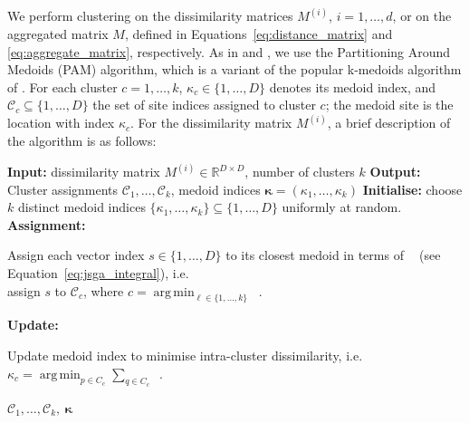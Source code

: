 \documentclass[12pt,compact]{article}
\DeclareMathOperator*{\argmin}{arg\,min}
\newcommand{\eJSGa}[1]{\mathop{\mathrm{eJS}_{i, #1}^{\mathrm{G}_{\lambda}}}\nolimits}
\DeclareRobustCommand{\eJSGai}{\mathop{\mathrm{eJS}^{\mathrm{G}_{\lambda}}}\nolimits}
\begin{document}
We perform clustering on the dissimilarity matrices $M^{(i)}$, $i = 1, \ldots, d$, or on the aggregated matrix $M$, defined in Equations~\eqref{eq:distance_matrix} and \eqref{eq:aggregate_matrix}, respectively.
As in \citet{Bernard2013} and \citet{Vignotto2021}, we use the Partitioning Around Medoids (PAM) algorithm, which is a variant of the popular k-medoids algorithm of \citet{Kaufman1987}.
For each cluster $c = 1, \ldots, k$, $\kappa_c \in \{1, \ldots, D\}$ denotes its medoid index, and $\mathcal{C}_c \subseteq \{1, \ldots, D\}$ the set of site indices assigned to cluster $c$; the medoid site is the location with index $\kappa_c$.
For the dissimilarity matrix $M^{(i)}$, a brief description of the algorithm is as follows:
\begin{algorithm}[htb]
  \caption{Partitioning Around Medoids (PAM) algorithm using the $\eJSGai{}$ divergence.}
  \label{alg:kmedoids_kappa}
  \begin{algorithmic}[1]
    \State \textbf{Input:} dissimilarity matrix $M^{(i)}\in\mathbb{R}^{D\times D}$, number of clusters $k$
    \State \textbf{Output:} Cluster assignments $\mathcal{C}_1,\dots,\mathcal{C}_k$, medoid indices $\boldsymbol{\kappa}=(\kappa_1,\dots,\kappa_k)$
    \State \textbf{Initialise:} choose $k$ distinct medoid indices $\{\kappa_1,\dots,\kappa_k\}\subseteq\{1,\dots,D\}$ uniformly at random.
    \Repeat
    \State \textbf{Assignment:} \parbox[t]{.82\linewidth}{\raggedright Assign each vector index $s\in\{1,\dots,D\}$ to its closest medoid in terms of $\eJSGai{}$ (see Equation~\eqref{eq:jsga_integral}), i.e.\ \\ assign $s$ to $\mathcal{C}_c$, where $c = \argmin_{\ell\in\{1,\dots,k\}} \eJSGa{s,\kappa_\ell}$.}
        \State \textbf{Update:} \parbox[t]{.82\linewidth}{\raggedright Update medoid index to minimise intra-cluster dissimilarity, i.e.\ $\kappa_c = \argmin_{p\in C_c}\sum_{q\in C_c} \eJSGa{p,q}$.}
        \State {}
      \EndFor
    \State \Return $\mathcal{C}_1,\dots,\mathcal{C}_k,\ \boldsymbol{\kappa}$
  \end{algorithmic}
\end{algorithm}
\end{document}
